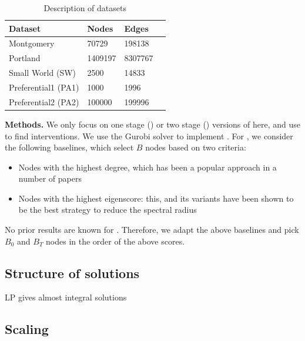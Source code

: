 \begin{table}[!h]
\centering
\begin{tabular}{llll}
\hline
 \textbf{Dataset} & \textbf{Nodes} & \textbf{Edges}   \\ \hline
 Montgomery & 70729 & 198138 \\
 Portland & 1409197 & 8307767 \\
 Small World (SW) & 2500 & 14833 \\   
 Preferential1 (PA1) & 1000 & 1996 \\ 
Preferential2 (PA2) & 100000 & 199996 \\ \hline
\end{tabular}
\caption{Description of datasets}
\label{tab:datasets}
\end{table}

\noindent
\textbf{Methods.}
We only focus on one stage (\probone) or two stage (\probtwo) versions of \prob{} here, and use \algo{} to find 
interventions. We use the Gurobi solver \cite{gurobi} to implement \algo{}.
For \probone{}, we consider the following baselines, which select $B$ nodes based on two criteria:
\begin{itemize}
\item
Nodes with the highest degree, which has been a popular approach in a number of papers
\cite{salathe:plos12, Barabasi509}
\item
Nodes with the highest eigenscore: this, and its variants have been shown to be the best strategy to reduce the spectral radius
\cite{tong:cikm12,zhang2015controlling,YaoSDM2014,AAAI1816714,PreciadoVM13_2,PreciadoVM13,PreciadoVM14}
\end{itemize}

No prior results are known for \probtwo{}. Therefore, we adapt the above baselines and pick $B_0$ and $B_T$
nodes in the order of the above scores.

\subsection{Structure of solutions}

LP gives almost integral solutions

\subsection{Scaling}

